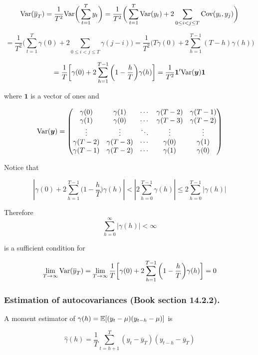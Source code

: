 \[
\Var(\overline{y}_T) = \frac{1}{T^2} \Var \bigg( \sum_{t=1}^T y_t \bigg) = \frac{1}{T^2} \bigg(\sum_{t=1}^T  \Var(y_t) + 2 \sum_{0 \leq i < j \leq T } \Cov(y_i, y_j)   \bigg)
\]

\[
= \frac{1}{T^2} \bigg(\sum_{t=1}^T  \gamma(0) + 2 \sum_{0 \leq i < j \leq T } \gamma(j-i)  \bigg) = \frac{1}{T^2} \bigg( T  \gamma(0) + 2 \sum_{h = 1 }^{T-1} (T - h )\gamma(h)  \bigg)
\]

\[
= \frac{1}{T} \bigg[ \gamma(0) + 2 \sum_{h=1}^{T-1} \bigg(1 - \frac{h}{T} \bigg) \gamma(h) \bigg] = \frac{1}{T^2} \boldsymbol{1}' \Var(\boldsymbol{y}) \boldsymbol{1}
\]

where \(\boldsymbol{1}\) is a vector of ones and

\[
\Var(\boldsymbol{y}) = \begin{pmatrix} 
\gamma(0) &  \gamma(1) & \cdots  &  \gamma(T-2) & \gamma(T-1) \\
\gamma(1) &  \gamma(0) & \cdots  &  \gamma(T-3) & \gamma(T-2) \\
\vdots &  \vdots & \ddots  &  \vdots & \vdots \\
\gamma(T - 2) &  \gamma(T - 3) & \cdots  &  \gamma(0) & \gamma(1) \\
\gamma(T - 1) &  \gamma(T - 2) & \cdots  &  \gamma(1) & \gamma(0) 
\end{pmatrix} 
\]

Notice that

\[
\left| \gamma(0) + 2 \sum_{h=1}^{T-1} \bigg(1 - \frac{h}{T} \bigg) \gamma(h)  \right| < \left| 2 \sum_{h=0}^{T-1}\gamma(h) \right| \leq 2 \sum_{h=0}^{T-1} \left|  \gamma(h) \right| 
\]

Therefore
\[
\sum_{h=0}^{\infty} \left|  \gamma(h) \right| < \infty
\]

is a sufficient condition for 

\[
\lim_{T \to \infty} \Var(\overline{y}_T) = \lim_{T \to \infty}  \frac{1}{T} \bigg[ \gamma(0) + 2 \sum_{h=1}^{T-1} \bigg(1 - \frac{h}{T} \bigg) \gamma(h) \bigg]  = 0
\]

\subsubsection{Estimation of autocovariances (Book section 14.2.2).}
\label{sec:tsch14.2.2}

A moment estimator of \(\gamma(h) =  \E[(y_t - \mu)(y_{t-h} - \mu)]\) is

\[
\hat{\gamma}(h) = \frac{1}{T} \sum_{t=h+1}^T(y_t - \overline{y}_T)(y_{t-h} - \overline{y}_T)
\]

